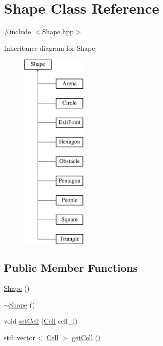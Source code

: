 \hypertarget{class_shape}{}\section{Shape Class Reference}
\label{class_shape}


{\ttfamily \#include $<$Shape.\+hpp$>$}

Inheritance diagram for Shape\+:\begin{figure}[H]
\begin{center}
\leavevmode
\includegraphics[height=10.000000cm]{class_shape}
\end{center}
\end{figure}
\subsection*{Public Member Functions}
\begin{DoxyCompactItemize}
\item 
\mbox{\hyperlink{class_shape_aaa8d87171e65e0d8ba3c5459978992a7}{Shape}} ()
\item 
\mbox{\hyperlink{class_shape_a935afc9e576015f967d90de56977167d}{$\sim$\+Shape}} ()
\item 
void \mbox{\hyperlink{class_shape_a9f07382e9173d32feaa737fe57560c9c}{set\+Cell}} (\mbox{\hyperlink{class_cell}{Cell}} cell\+\_\+i)
\item 
std\+::vector$<$ \mbox{\hyperlink{class_cell}{Cell}} $>$ \mbox{\hyperlink{class_shape_ad1951cad2df16392cab74b472020b851}{get\+Cell}} ()
\end{DoxyCompactItemize}


